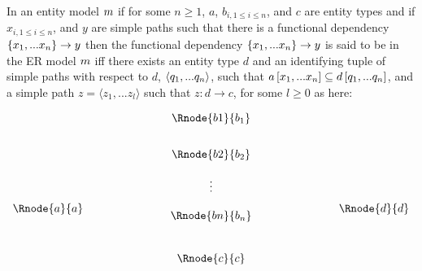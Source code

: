 \begin{definition}
\noindent In an entity model ${m}$  
if for some $n \geq 1$, $a$, $b_{i, 1 \leq i \leq n}$,  and $c$ are entity types and 
if  $x_{i, 1 \leq i \leq n}$, and $y$ are simple paths such
that there is a functional dependency $\{x_1,...x_n\} \rightarrow y$
 then the functional dependency $\{x_1,...x_n\} \rightarrow y$ is said to be  in the ER model ${m}$ iff  there exists an entity type $d$ and 
an identifying tuple of simple paths with respect to
$d$, $\langle q_1,...q_n\rangle$, such that $a\left[x_1,...x_n\right]\subseteq d\left[q_1,...q_n\right]$, and a simple
path $z=\langle z_1,...z_l \rangle$ such that $z:d\rightarrow c$, for some $l \geq 0$ as here:


\setlength{\arraycolsep}{.2cm}
\begin{center}

$
\begin{array}{cp{2cm}c p{2cm} c}
             &  & \Rnode{b1}{b_1} & &               \\ [0.7cm]
						 &  & \Rnode{b2}{b_2} & &               \\ [0.4cm]
						 &  &     \vdots      & &               \\ [0.2cm]
\Rnode{a}{a} &  &                 & & \Rnode{d}{d}  \\ [-0.2cm]
             &  & \Rnode{bn}{b_n} & &               \\ [0.9cm]
             &  & \Rnode{c}{c}    & &               \\
\end{array}
$
\end{center}



\end{definition}
